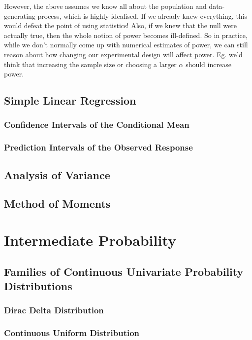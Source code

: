 \documentclass[11pt]{report} %
\begin{document}
However, the above assumes we know all about the population and data-generating process, which is highly idealised. If we already knew everything, this would defeat the point of using statistics! Also, if we knew that the null were actually true, then the whole notion of power becomes ill-defined. So in practice, while we don't normally come up with numerical estimates of power, we can still reason about how changing our experimental design will affect power. Eg. we'd think that increasing the sample size or choosing a larger $\alpha$ should increase power.

\section{Simple Linear Regression}

\subsection{Confidence Intervals of the Conditional Mean}

\subsection{Prediction Intervals of the Observed Response}

\section{Analysis of Variance}

\section{Method of Moments}

\chapter{Intermediate Probability}

\section{Families of Continuous Univariate Probability Distributions}

\subsection{Dirac Delta Distribution}

\subsection{Continuous Uniform Distribution}
\end{document}

